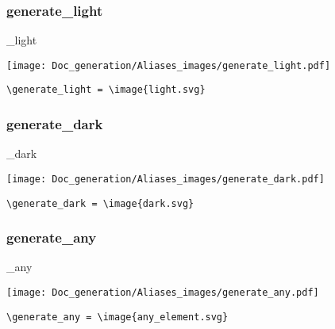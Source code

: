 \documentclass{article}
\begin{document}
\subsubsection{generate\_light}
\begin{minipage}{0.45\linewidth}
\raggedright
\begin{spverbatim}
\generate_light 
\end{spverbatim}
\end{minipage}
\begin{minipage}{0.45\linewidth}
\raggedleft
\texttt{[image: Doc\_generation/Aliases\_images/generate\_light.pdf]}
\end{minipage}
\begin{center}
\begin{BVerbatim}
\generate_light = \image{light.svg}
\end{BVerbatim}
\end{center}

\subsubsection{generate\_dark}
\begin{minipage}{0.45\linewidth}
\raggedright
\begin{spverbatim}
\generate_dark 
\end{spverbatim}
\end{minipage}
\begin{minipage}{0.45\linewidth}
\raggedleft
\texttt{[image: Doc\_generation/Aliases\_images/generate\_dark.pdf]}
\end{minipage}
\begin{center}
\begin{BVerbatim}
\generate_dark = \image{dark.svg}
\end{BVerbatim}
\end{center}

\subsubsection{generate\_any}
\begin{minipage}{0.45\linewidth}
\raggedright
\begin{spverbatim}
\generate_any 
\end{spverbatim}
\end{minipage}
\begin{minipage}{0.45\linewidth}
\raggedleft
\texttt{[image: Doc\_generation/Aliases\_images/generate\_any.pdf]}
\end{minipage}
\begin{center}
\begin{BVerbatim}
\generate_any = \image{any_element.svg}
\end{BVerbatim}
\end{center}
\end{document}
